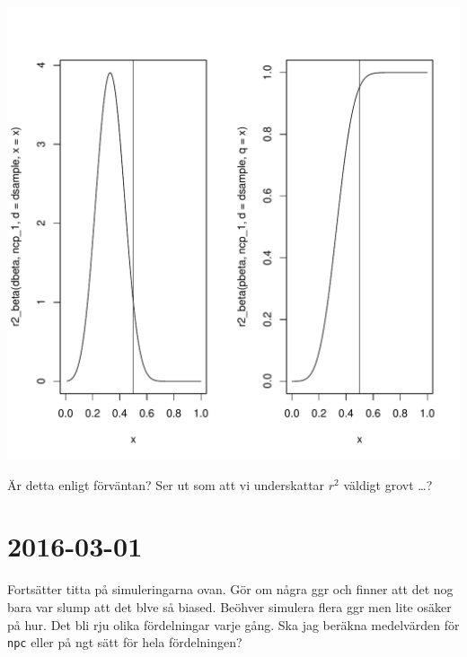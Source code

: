 \documentclass[]{article}
\begin{document}
\includegraphics{2016_w09_files/figure-latex/unnamed-chunk-3-1.pdf}

Är detta enligt förväntan? Ser ut som att vi underskattar \(r^2\)
väldigt grovt \ldots{}?

\section{2016-03-01}\label{section-1}

Fortsätter titta på simuleringarna ovan. Gör om några ggr och finner att
det nog bara var slump att det blve så biased. Beöhver simulera flera
ggr men lite osäker på hur. Det bli rju olika fördelningar varje gång.
Ska jag beräkna medelvärden för \texttt{npc} eller på ngt sätt för hela
fördelningen?
\end{document}
